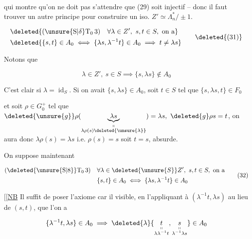 qui montre qu'on ne doit pas s'attendre que (29) soit injectif -- donc il faut trouver un autre principe pour construire un iso. $Z'\simeq\Lambda_n^*/\pm1$.


\[
\begin{aligned}
 &\deleted{(\unsure{\mathrm S|\delta}\mathrm T_0\,3)\quad\forall\lambda\in Z',\ s,t\in S,\ \text{on a}}\\
 &\deleted{\{s,t\}\in A_0\iff\{\lambda s,\lambda^{-1}t\}\in A_0\implies t\ne\lambda s}
\end{aligned}\tag*{\deleted{(31)}}
\]

Notons que

\[
\lambda\in Z',\ s\in S\implies\{s,\lambda s\}\notin A_0\tag*{(31)}
\]

C'est clair si $\lambda=\operatorname{id}_S$. Si on avait $\{s,\lambda s\}\in A_0$, soit $t\in S$ tel que $\{s,\lambda s,t\}\in F_0$


et soit $\rho\in G_0^+$ tel que $\deleted{\unsure{g}}\rho(\underbrace{\lambda s}_{\substack{\shortparallel\\\lambda\rho(s)\deleted{\unsure{\lambda}}}})=\lambda s,\ \deleted{g}\rho s=t$, on aura donc $\lambda\rho(s)=\lambda s$ i.e. $\rho(s)=s$ soit $t=s$, absurde.

On suppose maintenant

\[
\begin{aligned}
 (\deleted{\unsure{\mathrm S|8}}\mathrm T_0\,3)\quad&\forall\lambda\in\deleted{\unsure{S}}Z',\ s,t\in S,\ \text{on a}\\
 &\{s,t\}\in A_0\iff\{\lambda s,\lambda^{-1}t\}\in A_0
\end{aligned}\tag*{(32)}
\]

$\bigl[\!\bigl[$\uline{NB} Il suffit de poser  l'axiome \inserted{$\Longrightarrow$} car il  visible, en l'appliquant à $(\lambda^{-1}t,\lambda s)$ au lieu de $(s,t)$, que l'on a

\[
\{\lambda^{-1}t,\lambda s\}\in A_0\implies\deleted{\lambda}\{\underset{\substack{\shortparallel\\\lambda\lambda^{-1}t}}{t},\underset{\substack{\shortparallel\\\lambda^{-1}\lambda s}}{s}\}\in A_0
\]

